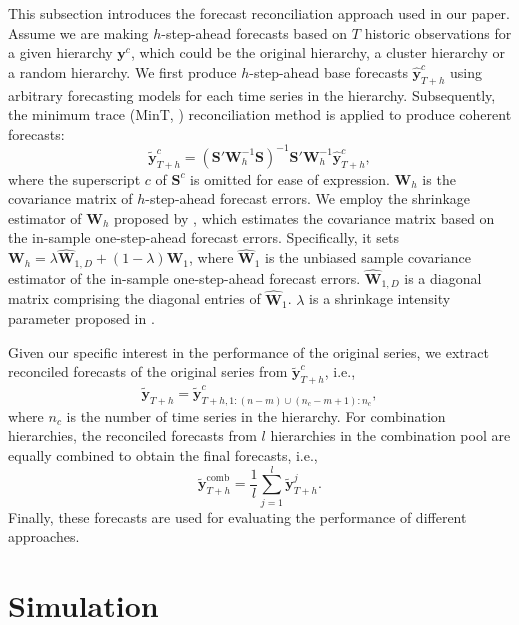 \documentclass[a4paper,review,12pt,authoryear]{elsarticle}
\begin{document}
This subsection introduces the forecast reconciliation approach used in our paper. Assume we are making $h$-step-ahead forecasts based on $T$ historic observations for a given hierarchy $\boldsymbol{y}^c$, which could be the original hierarchy, a cluster hierarchy or a random hierarchy. 
We first produce $h$-step-ahead base forecasts $\hat{\boldsymbol{y}}^c_{T+h}$ using arbitrary forecasting models for each time series in the hierarchy. Subsequently, the minimum trace (MinT, \citealp{wickramasuriyaOptimalForecastReconciliation2019}) reconciliation method is applied to produce coherent forecasts:
\[
    \tilde{\boldsymbol{y}}_{T+h}^c = (\boldsymbol{S}'\boldsymbol{W}_h^{-1}\boldsymbol{S})^{-1}\boldsymbol{S}'\boldsymbol{W}_h^{-1}\hat{\boldsymbol{y}}_{T+h}^c,
\]
where the superscript $c$ of $\boldsymbol{S}^c$ is omitted for ease of expression. $\boldsymbol{W}_h$ is the covariance matrix of $h$-step-ahead forecast errors. We employ the shrinkage estimator of $\boldsymbol{W}_h$ proposed by \cite{wickramasuriyaOptimalForecastReconciliation2019}, which estimates the covariance matrix based on the in-sample one-step-ahead forecast errors.
Specifically, it sets  $\boldsymbol{W}_h = \lambda \hat{\boldsymbol{W}}_{1,D} + (1-\lambda)\hat{\boldsymbol{W}}_1$, where $\hat{\boldsymbol{W}}_1$ is the unbiased sample covariance estimator of the in-sample one-step-ahead forecast errors. $\hat{\boldsymbol{W}}_{1,D}$ is a diagonal matrix comprising the diagonal entries of $\hat{\boldsymbol{W}}_1$. $\lambda$ is a shrinkage intensity parameter proposed in \cite{SchaferStrimmer2005}. 

Given our specific interest in the performance of the original series, we extract reconciled forecasts of the original series from $\tilde{\boldsymbol{y}}_{T+h}^c$, i.e.,
\[
  \tilde{\boldsymbol{y}}_{T+h} = \tilde{\boldsymbol{y}}^c_{T+h, 1:(n-m) \cup (n_c - m + 1): n_c},
\]
where $n_c$ is the number of time series in the hierarchy. For combination hierarchies, the reconciled forecasts from $l$ hierarchies in the combination pool are equally combined to obtain the final forecasts, i.e.,
\[
  \tilde{\boldsymbol{y}}_{T+h}^{\text{comb}} = \frac{1}{l} \sum_{j=1}^l \tilde{\boldsymbol{y}}_{T+h}^j.
\]
Finally, these forecasts are used for evaluating the performance of different approaches.

\section{Simulation}
\label{sec:simulation}
\end{document}
